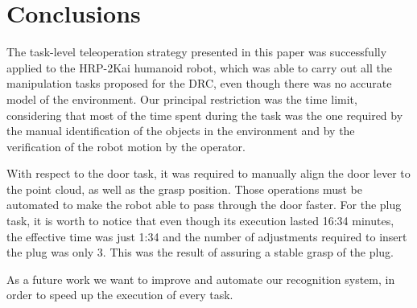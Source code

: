 \section{Conclusions}
	\label{sec:conclusions}
	
	The task-level teleoperation strategy presented in this paper was successfully applied
	to the HRP-2Kai humanoid robot, which was able to carry out all the manipulation tasks
	proposed for the DRC, even though there was no accurate model of the environment.
	Our principal restriction was the time limit, considering that most of the time spent
	during the task was the one required by the manual identification of the objects in the
	environment and by the verification of the robot motion by the operator.

	With respect to the door task, it was required to manually align the door lever to the
	point cloud, as well as the grasp position.
	Those operations must be automated to make the robot able to pass through the door faster.
	For the plug task, it is worth to notice that even though its execution lasted 16:34 minutes,
	the effective time was just 1:34 and the number of adjustments required to insert the plug was
	only 3.
	This was the result of assuring a stable grasp of the plug.
	
	As a future work we want to improve and automate our recognition system,
	in order to speed up the execution of every task.